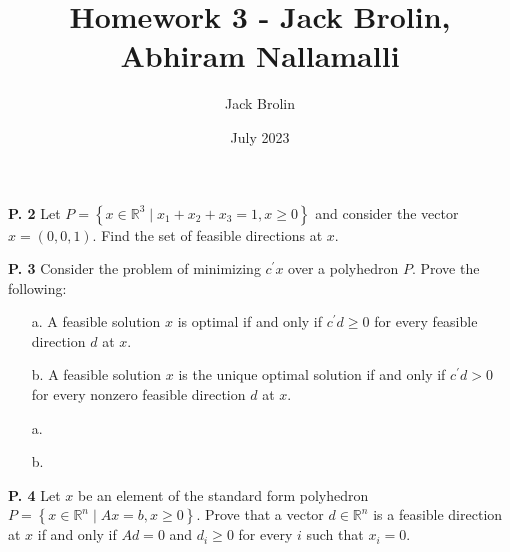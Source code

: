 \documentclass{article}
\title{Homework 3 - Jack Brolin, Abhiram Nallamalli}
\author{Jack Brolin}
\date{July 2023}
\begin{document}
\maketitle

\begin{jacklist}
    \begin{framed} 
    \item [\textbf{P. 2}] Let $P=\left\{x \in \mathbb{R}^{3} \mid x_{1}+x_{2}+x_{3}=1, x \geq 0\right\}$ and consider the vector 
        $x=(0,0,1)$. Find the set of feasible directions at $x$.
    \end{framed}

\newpage
    \begin{framed} 
    \item [\textbf{P. 3}] Consider the problem of minimizing $c^{\prime} x$ over a polyhedron $P$. Prove the following:
        \begin{itemize}
            \item [a.] A feasible solution $x$ is optimal if and only if $c^{\prime} d \geq 0$ for every feasible direction $d$ at $x$. 
            \item [b.] A feasible solution $x$ is the unique optimal solution if and only if $c^{\prime} d>0$ 
                for every nonzero feasible direction $d$ at $x$. 
        \end{itemize}
    \end{framed}
    \begin{itemize}
        \item [a.] 
        \item [b.]
    \end{itemize}

\newpage
    \begin{framed} 
    \item [\textbf{P. 4}] Let $x$ be an element of the standard form polyhedron 
        $P=\left\{x \in \mathbb{R}^{n} \mid A x=b, x \geq 0\right\}$. Prove that a vector $d \in \mathbb{R}^{n}$ is a feasible 
        direction at $x$ if and only if $A d=0$ and $d_{i} \geq 0$ for every $i$ such that $x_{i}=0$.
    \end{framed}


\end{jacklist}
\end{document}
